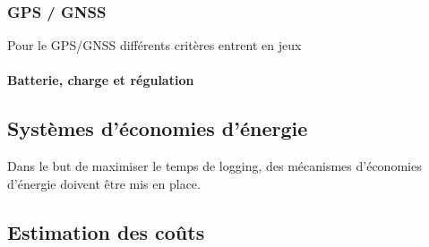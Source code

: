 \clearpage

\subsubsection{GPS / GNSS}
Pour le \gls{GPS}/\gls{GNSS} différents critères entrent en jeux

\paragraph{Batterie, charge et régulation} 

\subsection{Systèmes d'économies d'énergie} \label{ssec:Low-power}
Dans le but de maximiser le temps de logging, des mécanismes d'économies d'énergie doivent être mis en place. 

\subsection{Estimation des coûts} \label{ssec:Estimation-Couts}
